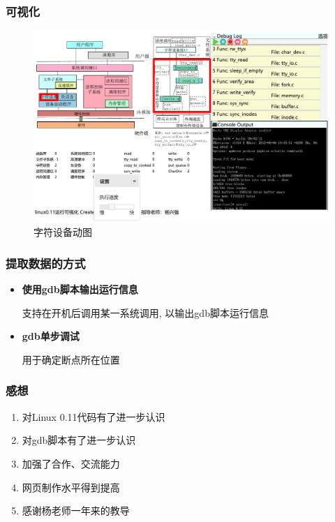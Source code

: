 \documentclass[14pt,UTF-8]{beamer}
\begin{document}
\begin{frame}
\frametitle{可视化}
\begin{figure}[htbp]
	\centering
	\includegraphics[width=\textwidth,natwidth=756 ,natheight=450]{img/chrdrv.pdf}
	\caption[]{字符设备动图}
	\label{fig:ChrDrvgraph}
\end{figure}

\end{frame}
\begin{frame}
\frametitle{提取数据的方式}
\begin{itemize}
	\item \textbf{使用gdb脚本输出运行信息}
	
	支持在开机后调用某一系统调用, 以输出gdb脚本运行信息
	\item \textbf{gdb单步调试}

	用于确定断点所在位置
\end{itemize}
\end{frame}

\begin{frame}
\frametitle{感想}
\begin{enumerate}
	\item 对Linux 0.11代码有了进一步认识
	\item 对gdb脚本有了进一步认识
	\item 加强了合作、交流能力
	\item 网页制作水平得到提高
	\item 感谢杨老师一年来的教导
\end{enumerate}
\end{frame}
\end{document}
